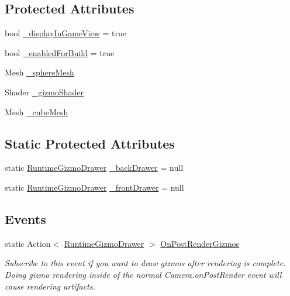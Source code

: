 \subsection*{Protected Attributes}
\begin{DoxyCompactItemize}
\item 
bool \mbox{\hyperlink{class_leap_1_1_unity_1_1_runtime_gizmos_1_1_runtime_gizmo_manager_ab534fdb082ce7c5a75833ae7e08ed5da}{\+\_\+display\+In\+Game\+View}} = true
\item 
bool \mbox{\hyperlink{class_leap_1_1_unity_1_1_runtime_gizmos_1_1_runtime_gizmo_manager_a7bf0918df0d852a8de47a79d031dd77d}{\+\_\+enabled\+For\+Build}} = true
\item 
Mesh \mbox{\hyperlink{class_leap_1_1_unity_1_1_runtime_gizmos_1_1_runtime_gizmo_manager_a0742e61b770f3d116bfbfd36a271bdf6}{\+\_\+sphere\+Mesh}}
\item 
Shader \mbox{\hyperlink{class_leap_1_1_unity_1_1_runtime_gizmos_1_1_runtime_gizmo_manager_a5573de0ed368c2ff35447e1d8e6401b6}{\+\_\+gizmo\+Shader}}
\item 
Mesh \mbox{\hyperlink{class_leap_1_1_unity_1_1_runtime_gizmos_1_1_runtime_gizmo_manager_ab0fa01c61a6fe164f4023641378780a8}{\+\_\+cube\+Mesh}}
\end{DoxyCompactItemize}
\subsection*{Static Protected Attributes}
\begin{DoxyCompactItemize}
\item 
static \mbox{\hyperlink{class_leap_1_1_unity_1_1_runtime_gizmos_1_1_runtime_gizmo_drawer}{Runtime\+Gizmo\+Drawer}} \mbox{\hyperlink{class_leap_1_1_unity_1_1_runtime_gizmos_1_1_runtime_gizmo_manager_aa0126efce88d0031b0c24c9a1d53bc61}{\+\_\+back\+Drawer}} = null
\item 
static \mbox{\hyperlink{class_leap_1_1_unity_1_1_runtime_gizmos_1_1_runtime_gizmo_drawer}{Runtime\+Gizmo\+Drawer}} \mbox{\hyperlink{class_leap_1_1_unity_1_1_runtime_gizmos_1_1_runtime_gizmo_manager_a0d7047698652234b6d6394adca102748}{\+\_\+front\+Drawer}} = null
\end{DoxyCompactItemize}
\subsection*{Events}
\begin{DoxyCompactItemize}
\item 
static Action$<$ \mbox{\hyperlink{class_leap_1_1_unity_1_1_runtime_gizmos_1_1_runtime_gizmo_drawer}{Runtime\+Gizmo\+Drawer}} $>$ \mbox{\hyperlink{class_leap_1_1_unity_1_1_runtime_gizmos_1_1_runtime_gizmo_manager_a604c94ac5df754c6b7c7edbbedb8c004}{On\+Post\+Render\+Gizmos}}
\begin{DoxyCompactList}\small\item\em Subscribe to this event if you want to draw gizmos after rendering is complete. Doing gizmo rendering inside of the normal Camera.\+on\+Post\+Render event will cause rendering artifacts. \end{DoxyCompactList}\end{DoxyCompactItemize}


